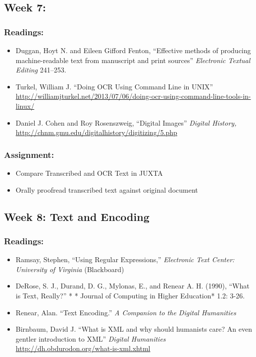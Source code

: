 \documentclass[]{article}
\begin{document}
\subsection{Week 7:}\label{week-7}

\subsubsection{Readings:}\label{readings-5}

\begin{itemize}
\itemsep1pt\parskip0pt
\item
  Duggan, Hoyt N. and Eileen Gifford Fenton, ``Effective methods of
  producing machine-readable text from manuscript and print sources''
  \emph{Electronic Textual Editing} 241--253.
\item
  Turkel, William J. ``Doing OCR Using Command Line in UNIX''
  \url{http://williamjturkel.net/2013/07/06/doing-ocr-using-command-line-tools-in-linux/}
\item
  Daniel J. Cohen and Roy Rosenszweig, ``Digital Images'' \emph{Digital
  History,} \url{http://chnm.gmu.edu/digitalhistory/digitizing/5.php}
\end{itemize}

\subsubsection{Assignment:}\label{assignment-5}

\begin{itemize}
\itemsep1pt\parskip0pt
\item
  Compare Transcribed and OCR Text in JUXTA\\
\item
  Orally proofread transcribed text against original document
\end{itemize}

\subsection{Week 8: Text and Encoding}\label{week-8-text-and-encoding}

\subsubsection{Readings:}\label{readings-6}

\begin{itemize}
\itemsep1pt\parskip0pt
\item
  Ramsay, Stephen, ``Using Regular Expressions,'' \emph{Electronic Text
  Center: University of Virginia} (Blackboard)
\item
  DeRose, S. J., Durand, D. G., Mylonas, E., and Renear A. H. (1990),
  ``What is Text, Really?'' * * Journal of Computing in Higher
  Education* 1.2: 3-26.
\item
  Renear, Alan. ``Text Encoding.'' \emph{A Companion to the Digital
  Humanities}
\item
  Birnbaum, David J. ``What is XML and why should humanists care? An
  even gentler introduction to XML'' \emph{Digital Humanities}
  \url{http://dh.obdurodon.org/what-is-xml.xhtml}
\end{itemize}
\end{document}
